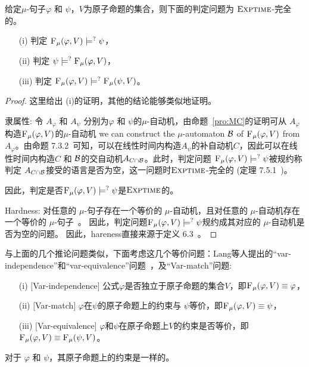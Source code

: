\begin{theorem}[Entailment]
	\label{thm:Ent}
	给定$\mu$-句子$\varphi$ 和 $\psi$，$V$为原子命题的集合，则下面的判定问题为 $\textsc{Exptime}$-完全的。
	\begin{itemize}
		\item[(i)] 判定  ${\textsc{F}_{\textsc{$\mu$}}}(\varphi, V ) \models^? \psi$，
		\item[(ii)] 判定  $\psi \models^? {\textsc{F}_{\textsc{$\mu$}}}(\varphi, V)$，
		\item[(iii)] 判定 ${\textsc{F}_{\textsc{$\mu$}}}(\varphi, V) \models^? {\textsc{F}_{\textsc{$\mu$}}}(\psi, V)$。
	\end{itemize}
\end{theorem}
\begin{proof}
	这里给出 (i)的证明，其他的结论能够类似地证明。
	
	
	隶属性: 令 $A_{\varphi}$ 和 $A_{\psi}$ 分别为$\varphi$ 和 $\psi$的$\mu$-自动机，由命题~\ref{pro:MC}的证明可从 $A_{\varphi}$构造${\textsc{F}_{\textsc{$\mu$}}}(\varphi, V )$的$\mu$-自动机 we can construct the $\mu$-automaton ${\cal B}$ of ${\textsc{F}_{\textsc{$\mu$}}}(\varphi, V )$ from $A_{\varphi}$。由命题 7.3.2~\cite{comon1997tree}可知，可以在线性时间内构造$A_\psi$的补自动机$C$，因此可以在线性时间内构造$C$ 和 ${\cal B}$的交自动机$A_{C \cap {\cal B}}$。此时，判定问题 ${\textsc{F}_{\textsc{$\mu$}}}(\varphi, V ) \models^? \psi$被规约称判定 $A_{C \cap {\cal B}}$接受的语言是否为空，这一问题时$\textsc{Exptime}$-完全的 (定理 7.5.1~\cite{comon1997tree})。
	
	因此，判定是否${\textsc{F}_{\textsc{$\mu$}}}(\varphi, V ) \models^? \psi$是$\textsc{Exptime}$的。 
	
	Hardness: 对任意的 $\mu$-句子存在一个等价的 $\mu$-自动机，且对任意的 $\mu$-自动机存在一个等价的 $\mu$-句子~\cite{bradfield2018mu}。
因此，判定问题${\textsc{F}_{\textsc{$\mu$}}}(\varphi, V ) \models^? \psi$规约成其对应的 $\mu$-自动机是否为空的问题。
	因此，hareness直接来源于定义 6.3~\cite{DBLP:journals/siamcomp/EmersonJ99}。
\end{proof}

与上面的几个推论问题类似，下面考虑这几个等价问题：Lang等人提出的“var-independence”和“var-equivalence”问题~\cite{lang2003propositional}，及“Var-match”问题:
\begin{itemize}
	\item[(i)] $[$Var-independence$]$ 公式$\varphi$是否独立于原子命题的集合$V$，即${\textsc{F}_{\textsc{$\mu$}}}(\varphi,V) \equiv \varphi$，
	\item[(ii)] $[$Var-match$]$  $\varphi$在$\psi$的原子命题上的约束与 $\psi$等价，即${\textsc{F}_{\textsc{$\mu$}}}(\varphi, V) \equiv \psi$，
	\item[(iii)] $[$Var-equivalence$]$  $\varphi$和$\psi$在原子命题上$V$的约束是否等价，即${\textsc{F}_{\textsc{$\mu$}}}(\varphi, V) \equiv {\textsc{F}_{\textsc{$\mu$}}}(\psi, V)$。
\end{itemize}
对于 $\varphi$ 和 $\psi$，其原子命题上的约束是一样的。

